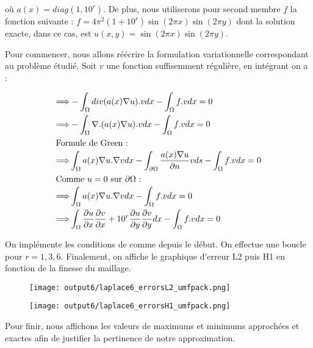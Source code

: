 \documentclass[11pt,a4paper]{report}
\begin{document}
				où $a(x) = diag(1,10^r)$. De plus, nous utiliserons pour second membre $f$ la fonction suivante : $f = 4\pi^2(1+10^r)\sin(2\pi x)\sin(2\pi y)$ dont la solution exacte, dans ce cas, est $ u(x,y) = \sin(2\pi x)\sin(2\pi y)$.
				
				Pour commencer, nous allons réécrire la formulation variationnelle correspondant au problème étudié. Soit $v$ une fonction suffisemment régulière, en intégrant on a : 
				
				\begin{align*}
				\Longrightarrow &\displaystyle - \int_{\Omega} div(a(x) \nabla u).v dx - \int_{\Omega} f.v dx = 0 \\
				\Longrightarrow & \displaystyle - \int_{\Omega} \nabla.(a(x) \nabla u).v dx - \int_{\Omega} f.v dx = 0 \\
				\intertext{Formule de Green : }
				\Longrightarrow & \displaystyle \int_{\Omega} a(x)\nabla u.\nabla v dx - \int_{\partial \Omega} \dfrac{a(x) \nabla u}{\partial n} v ds -  \int_{\Omega} f.v dx = 0 \\
				\intertext{Comme $u = 0$ sur $\partial\Omega$ : }
				\Longrightarrow & \int_{\Omega} a(x)\nabla u.\nabla v dx -  \int_{\Omega} f.v dx = 0 \\
				\Longrightarrow & \int_{\Omega} \dfrac{\partial u}{\partial x} \dfrac{\partial v}{\partial x} + 10^r \dfrac{\partial u}{\partial y}\dfrac{\partial v}{\partial y} dx -\int_{\Omega} f.v dx = 0
				\end{align*}
				
				On implémente les conditions de  comme depuis le début. On effectue une boucle pour $ r = 1 ,3 ,6$. Finalement, on affiche le graphique d'erreur L2 puis H1 en fonction de la finesse du maillage.
				
				\begin{figure}[H]
					\centering
					\texttt{[image: output6/laplace6\_errorsL2\_umfpack.png]}
				\end{figure}
				
				\begin{figure}[H]
					\centering
					\texttt{[image: output6/laplace6\_errorsH1\_umfpack.png]}
				\end{figure}
				
				Pour finir, nous affichons les valeurs de maximums et minimums approchées et exactes afin de justifier la pertinence de notre approximation.
				
\end{document}
